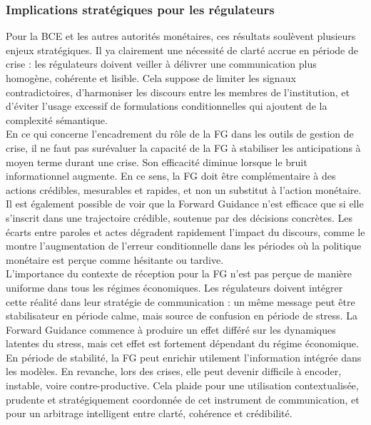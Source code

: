 \subsubsection{Implications stratégiques pour les régulateurs}

Pour la BCE et les autres autorités monétaires, ces résultats soulèvent plusieurs enjeux stratégiques. Il ya clairement une nécessité de clarté accrue en période de crise : les régulateurs doivent veiller à délivrer une communication plus homogène, cohérente et lisible. Cela suppose de limiter les signaux contradictoires, d’harmoniser les discours entre les membres de l’institution, et d’éviter l’usage excessif de formulations conditionnelles qui ajoutent de la complexité sémantique.\\

En ce qui concerne l'encadrement du rôle de la FG dans les outils de gestion de crise, il ne faut pas surévaluer la capacité de la FG à stabiliser les anticipations à moyen terme durant une crise. Son efficacité diminue lorsque le bruit informationnel augmente. En ce sens, la FG doit être complémentaire à des actions crédibles, mesurables et rapides, et non un substitut à l’action monétaire.\\

Il est également possible de voir que la Forward Guidance n’est efficace que si elle s’inscrit dans une trajectoire crédible, soutenue par des décisions concrètes. Les écarts entre paroles et actes dégradent rapidement l’impact du discours, comme le montre l’augmentation de l’erreur conditionnelle dans les périodes où la politique monétaire est perçue comme hésitante ou tardive.\\

L'importance du contexte de réception pour la FG n’est pas perçue de manière uniforme dans tous les régimes économiques. Les régulateurs doivent intégrer cette réalité dans leur stratégie de communication : un même message peut être stabilisateur en période calme, mais source de confusion en période de stress. La Forward Guidance commence à produire un effet différé sur les dynamiques latentes du stress, mais cet effet est fortement dépendant du régime économique. En période de stabilité, la FG peut enrichir utilement l’information intégrée dans les modèles. En revanche, lors des crises, elle peut devenir difficile à encoder, instable, voire contre-productive. Cela plaide pour une utilisation contextualisée, prudente et stratégiquement coordonnée de cet instrument de communication, et pour un arbitrage intelligent entre clarté, cohérence et crédibilité.\\

